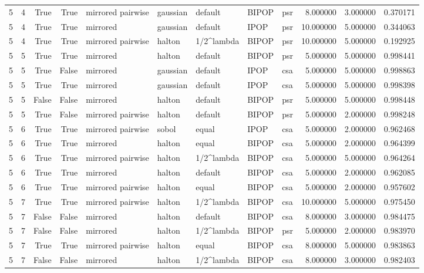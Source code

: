 \begin{tabular}{rrrrlllllrrr}
5 & 4 & True & True & mirrored pairwise & gaussian & default & BIPOP & psr & 8.000000 & 3.000000 & 0.370171 \\
5 & 4 & True & True & mirrored & gaussian & default & IPOP & psr & 10.000000 & 5.000000 & 0.344063 \\
5 & 4 & True & True & mirrored pairwise & halton & 1/2^lambda & BIPOP & psr & 10.000000 & 5.000000 & 0.192925 \\
5 & 5 & True & True & mirrored & halton & default & BIPOP & psr & 5.000000 & 5.000000 & 0.998441 \\
5 & 5 & True & False & mirrored & gaussian & default & IPOP & csa & 5.000000 & 5.000000 & 0.998863 \\
5 & 5 & True & True & mirrored & gaussian & default & IPOP & csa & 5.000000 & 5.000000 & 0.998398 \\
5 & 5 & False & False & mirrored & halton & default & BIPOP & psr & 5.000000 & 5.000000 & 0.998448 \\
5 & 5 & True & False & mirrored pairwise & halton & default & BIPOP & psr & 5.000000 & 2.000000 & 0.998248 \\
5 & 6 & True & True & mirrored pairwise & sobol & equal & IPOP & csa & 5.000000 & 2.000000 & 0.962468 \\
5 & 6 & True & True & mirrored & halton & equal & BIPOP & csa & 5.000000 & 2.000000 & 0.964399 \\
5 & 6 & True & True & mirrored pairwise & halton & 1/2^lambda & BIPOP & csa & 5.000000 & 5.000000 & 0.964264 \\
5 & 6 & True & True & mirrored & halton & default & BIPOP & csa & 5.000000 & 2.000000 & 0.962085 \\
5 & 6 & True & True & mirrored pairwise & halton & equal & BIPOP & csa & 5.000000 & 2.000000 & 0.957602 \\
5 & 7 & True & True & mirrored pairwise & halton & 1/2^lambda & BIPOP & csa & 10.000000 & 5.000000 & 0.975450 \\
5 & 7 & False & False & mirrored & halton & default & BIPOP & csa & 8.000000 & 3.000000 & 0.984475 \\
5 & 7 & False & False & mirrored & halton & 1/2^lambda & BIPOP & psr & 5.000000 & 2.000000 & 0.983970 \\
5 & 7 & True & True & mirrored pairwise & halton & equal & BIPOP & csa & 8.000000 & 5.000000 & 0.983863 \\
5 & 7 & False & False & mirrored & halton & 1/2^lambda & BIPOP & csa & 8.000000 & 3.000000 & 0.982403 \\

\end{tabular}
